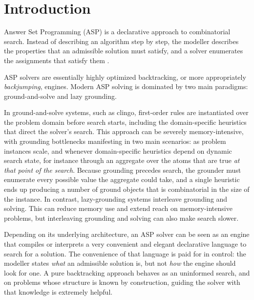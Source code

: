\chapter{Introduction}
\label{sec:introduction}
\label{sec:motivation}

Answer Set Programming (ASP) is a declarative approach to combinatorial search. Instead of describing an algorithm step by step, the modeller describes the properties that an admissible solution must satisfy, and a solver enumerates the assignments that satisfy them \cite{gelfond1988stable, schaub2024aspPractice, clingoGuide}.

ASP solvers are essentially highly optimized backtracking, or more appropriately \emph{backjumping}, engines. Modern ASP solving is dominated by two main paradigms: ground-and-solve and lazy grounding.

In ground-and-solve systems, such as clingo, first-order rules are instantiated over the problem domain before search starts, including the domain-specific heuristics that direct the solver's search. 
This approach can be severely memory-intensive, with grounding bottlenecks manifesting in two main scenarios: as problem instances scale, and whenever domain-specific heuristics depend on dynamic search state, for instance through an aggregate over the atoms that are true \emph{at that point of the search}. 
Because grounding precedes search, the grounder must enumerate every possible value the aggregate could take, and a single heuristic ends up producing a number of ground objects that is combinatorial in the size of the instance. In contrast, lazy-grounding systems interleave grounding and solving. This can reduce memory use and extend reach on memory-intensive problems, but interleaving grounding and solving can also make search slower.

Depending on its underlying architecture, an ASP solver can be seen as an engine that compiles or interprets a very convenient and elegant declarative language \cite{calimeri2020aspcore2} to search for a solution. The convenience of that language is paid for in control: the modeller states \emph{what} an admissible solution is, but not \emph{how} the engine should look for one. A pure backtracking approach behaves as an uninformed search, and on problems whose structure is known by construction, guiding the solver with that knowledge is extremely helpful.

